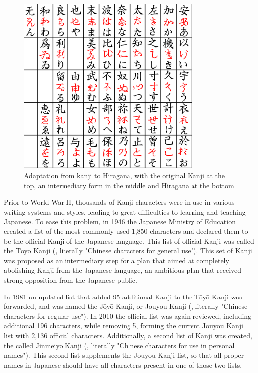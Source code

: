 \begin{figure}[h]
    \centering
    \includegraphics[width=0.8\textwidth]{Cap1/hiraganakanji}
    \caption{Adaptation from kanji to Hiragana, with the original Kanji at the top, an intermediary form in the middle and Hiragana at the bottom}
    \label{fig:kanji_to_hiragana}
\end{figure}

Prior to World War II, thousands of Kanji characters were in use in various writing systems and styles, leading to great difficulties to learning and teaching Japanese. To ease this problem, in 1946 the Japanese Ministry of Education created a list of the most commonly used 1,850 characters and declared them to be the official Kanji of the Japanese language. This list of official Kanji was called the T\={o}y\={o} Kanji (, literally "Chinese characters for general use"). This set of Kanji was proposed as an intermediary step for a plan that aimed at completely abolishing Kanji from the Japanese language, an ambitious plan that received strong opposition from the Japanese public.

In 1981 an updated list that added 95 additional Kanji to the T\={o}y\={o} Kanji was forwarded, and was named the J\={o}y\={o} Kanji, or Jouyou Kanji (, literally "Chinese characters for regular use"). In 2010 the official list was again reviewed, including additional 196 characters, while removing 5, forming the current Jouyou Kanji list with 2,136 official characters. Additionally, a second list of Kanji was created, the called Jinmeiy\={o} Kanji (, literally "Chinese characters for use in personal names"). This second list supplements the Jouyou Kanji list, so that all proper names in Japanese should have all characters present in one of those two lists.

